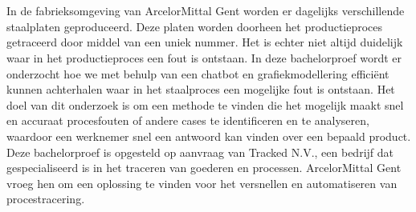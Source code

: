 
%
%
%
%
%

%



\chapter*{}
In de fabrieksomgeving van ArcelorMittal Gent worden er dagelijks verschillende staalplaten geproduceerd.
Deze platen worden doorheen het productieproces getraceerd door middel van een uniek nummer.
Het is echter niet altijd duidelijk waar in het productieproces een fout is ontstaan.
In deze bachelorproef wordt er onderzocht hoe we met behulp van een chatbot en grafiekmodellering efficiënt kunnen achterhalen waar in het staalproces een mogelijke fout is ontstaan.
Het doel van dit onderzoek is om een methode te vinden die het mogelijk maakt snel en accuraat procesfouten of andere cases te identificeren en te analyseren, waardoor een werknemer snel een antwoord kan vinden over een bepaald product.
Deze bachelorproef is opgesteld op aanvraag van Tracked N.V., een bedrijf dat gespecialiseerd is in het traceren van goederen en processen.
ArcelorMittal Gent vroeg hen om een oplossing te vinden voor het versnellen en automatiseren van procestracering. 

